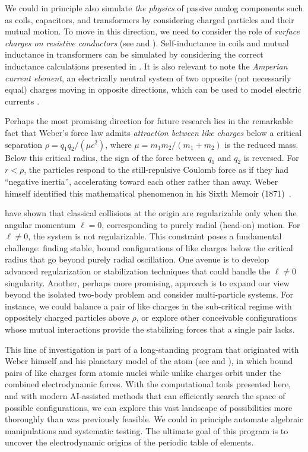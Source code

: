 \documentclass[12pt,a4paper]{article}
\theoremstyle{definition}
\theoremstyle{remark}
\begin{document}
We could in principle also simulate \textit{the physics} of passive analog components such as coils, capacitors, and transformers by considering charged particles and their mutual motion. To move in this direction, we need to consider the role of \textit{surface charges on resistive conductors} (see \citep{jackson1996} and \citep{assis-electric-force}). Self-inductance in coils and mutual inductance in transformers can be simulated by considering the correct inductance calculations presented in \citep{assis-inductance}. It is also relevant to note the \textit{Amperian current element}, an electrically neutral system of two opposite (not necessarily equal) charges moving in opposite directions, which can be used to model electric currents \citep{assis-ampere}.

Perhaps the most promising direction for future research lies in the remarkable fact that Weber's force law admits \textit{attraction between like charges} below a critical separation $\rho = q_1 q_2/(\mu c^2)$, where $\mu = m_1 m_2 / (m_1 + m_2)$ is the reduced mass. Below this critical radius, the sign of the force between $q_1$ and $q_2$ is reversed. For $r < \rho$, the particles respond to the still-repulsive Coulomb force as if they had ``negative inertia'', accelerating toward each other rather than away. Weber himself identified this mathematical phenomenon in his Sixth Memoir (1871)~\citep{assis-weber-vol4}.

\citet{Frauenfelder2024} have shown that classical collisions at the origin are regularizable only when the angular momentum $\ell = 0$, corresponding to purely radial (head-on) motion. For $\ell \neq 0$, the system is not regularizable. This constraint poses a fundamental challenge: finding stable, bound configurations of like charges below the critical radius that go beyond purely radial oscillation. One avenue is to develop advanced regularization or stabilization techniques that could handle the $\ell \neq 0$ singularity. Another, perhaps more promising, approach is to expand our view beyond the isolated two-body problem and consider multi-particle systems. For instance, we could balance a pair of like charges in the sub-critical regime with oppositely charged particles above $\rho$, or explore other conceivable configurations whose mutual interactions provide the stabilizing forces that a single pair lacks.

This line of investigation is part of a long-standing program that originated with Weber himself and his planetary model of the atom (see \citep{assis-planetary-model} and \citep{assis-weber-vol4}), in which bound pairs of like charges form atomic nuclei while unlike charges orbit under the combined electrodynamic forces. With the computational tools presented here, and with modern AI-assisted methods that can efficiently search the space of possible configurations, we can explore this vast landscape of possibilities more thoroughly than was previously feasible. We could in principle automate algebraic manipulations and systematic testing. The ultimate goal of this program is to uncover the electrodynamic origins of the periodic table of elements.
\end{document}
